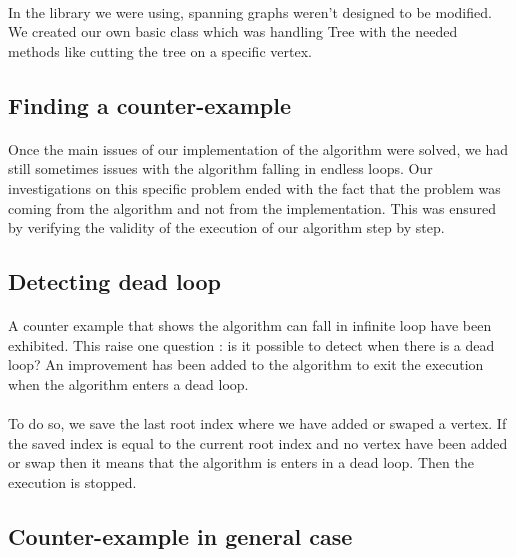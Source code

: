 \paragraph{}
In the library we were using, spanning graphs weren't designed to be modified. We
created our own basic class which was handling Tree with the needed methods like
cutting the tree on a specific vertex.

\subsection{Finding a counter-example}
\paragraph{}
Once the main issues of our implementation of the algorithm were solved, we
had still sometimes issues with the algorithm falling in endless loops. Our
investigations on this specific problem ended with the fact that the problem was
coming from the algorithm and not from the implementation. This was ensured by
verifying the validity of the execution of our algorithm step by step.



\subsection{Detecting dead loop}
\paragraph{}
A counter example that shows the algorithm can fall in infinite loop have been
exhibited. This raise one question : is it possible to detect when there is a
dead loop? An improvement has been added to the algorithm to exit the 
execution when the algorithm enters a dead loop.

\paragraph{}
To do so, we save the last root index where we have added or swaped a vertex. If
the saved index is equal to the current root index and no vertex have been
added or swap then it means that the algorithm is enters in a dead loop. Then
the execution is stopped.

\subsection{Counter-example in general case}
